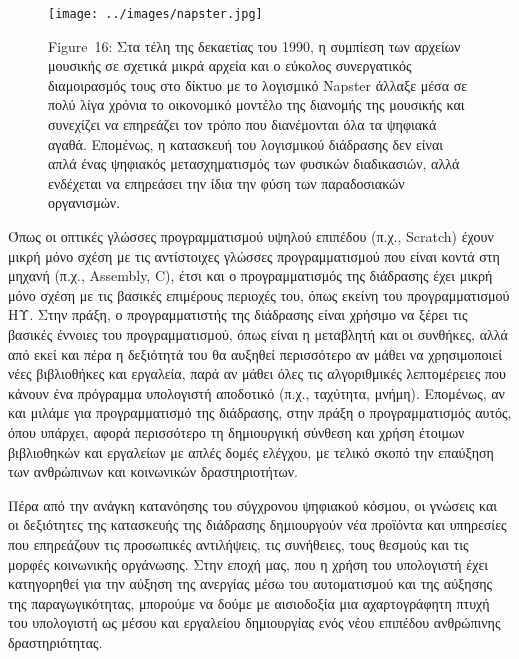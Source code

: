 \documentclass[
]{article}
\begin{document}
\leavevmode{}%
\begin{figure}
\hypertarget{fig:napster}{%
\centering
\texttt{[image: ../images/napster.jpg]}
\caption{Figure~16: Στα τέλη της δεκαετίας του 1990, η συμπίεση των
αρχείων μουσικής σε σχετικά μικρά αρχεία και ο εύκολος συνεργατικός
διαμοιρασμός τους στο δίκτυο με το λογισμικό Napster άλλαξε μέσα σε πολύ
λίγα χρόνια το οικονομικό μοντέλο της διανομής της μουσικής και
συνεχίζει να επηρεάζει τον τρόπο που διανέμονται όλα τα ψηφιακά αγαθά.
Επομένως, η κατασκευή του λογισμικού διάδρασης δεν είναι απλά ένας
ψηφιακός μετασχηματισμός των φυσικών διαδικασιών, αλλά ενδέχεται να
επηρεάσει την ίδια την φύση των παραδοσιακών
οργανισμών.}\label{fig:napster}
}
\end{figure}

Όπως οι οπτικές γλώσσες προγραμματισμού υψηλού επιπέδου (π.χ., Scratch)
έχουν μικρή μόνο σχέση με τις αντίστοιχες γλώσσες προγραμματισμού που
είναι κοντά στη μηχανή (π.χ., Assembly, C), έτσι και ο προγραμματισμός
της διάδρασης έχει μικρή μόνο σχέση με τις βασικές επιμέρους περιοχές
του, όπως εκείνη του προγραμματισμού ΗΥ. Στην πράξη, ο προγραμματιστής
της διάδρασης είναι χρήσιμο να ξέρει τις βασικές έννοιες του
προγραμματισμού, όπως είναι η μεταβλητή και οι συνθήκες, αλλά από εκεί
και πέρα η δεξιότητά του θα αυξηθεί περισσότερο αν μάθει να χρησιμοποιεί
νέες βιβλιοθήκες και εργαλεία, παρά αν μάθει όλες τις αλγοριθμικές
λεπτομέρειες που κάνουν ένα πρόγραμμα υπολογιστή αποδοτικό (π.χ.,
ταχύτητα, μνήμη). Επομένως, αν και μιλάμε για προγραμματισμό της
διάδρασης, στην πράξη ο προγραμματισμός αυτός, όπου υπάρχει, αφορά
περισσότερο τη δημιουργική σύνθεση και χρήση έτοιμων βιβλιοθηκών και
εργαλείων με απλές δομές ελέγχου, με τελικό σκοπό την επαύξηση των
ανθρώπινων και κοινωνικών δραστηριοτήτων.

Πέρα από την ανάγκη κατανόησης του σύγχρονου ψηφιακού κόσμου, οι γνώσεις
και οι δεξιότητες της κατασκευής της διάδρασης δημιουργούν νέα προϊόντα
και υπηρεσίες που επηρεάζουν τις προσωπικές αντιλήψεις, τις συνήθειες,
τους θεσμούς και τις μορφές κοινωνικής οργάνωσης. Στην εποχή μας, που η
χρήση του υπολογιστή έχει κατηγορηθεί για την αύξηση της ανεργίας μέσω
του αυτοματισμού και της αύξησης της παραγωγικότητας, μπορούμε να δούμε
με αισιοδοξία μια αχαρτογράφητη πτυχή του υπολογιστή ως μέσου και
εργαλείου δημιουργίας ενός νέου επιπέδου ανθρώπινης δραστηριότητας.
\end{document}
